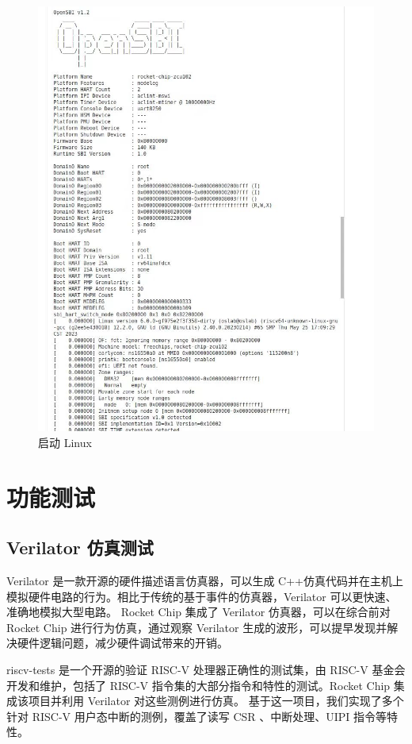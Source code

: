 \begin{figure}
    \centering
    \includegraphics[width=0.9\linewidth]{figures/boot-linux.jpg}
    \caption{启动 Linux}
    \label{fig:boot-linux}
\end{figure}

\section{功能测试}

\subsection{Verilator 仿真测试}
\label{sec:verilator}

Verilator \cite{verilator} 是一款开源的硬件描述语言仿真器，可以生成 C++仿真代码并在主机上模拟硬件电路的行为。相比于传统的基于事件的仿真器，Verilator 可以更快速、准确地模拟大型电路。
Rocket Chip 集成了 Verilator 仿真器，可以在综合前对 Rocket Chip 进行行为仿真，通过观察 Verilator 生成的波形，可以提早发现并解决硬件逻辑问题，减少硬件调试带来的开销。

riscv-tests \cite{riscvtests} 是一个开源的验证 RISC-V 处理器正确性的测试集，由 RISC-V 基金会开发和维护，包括了 RISC-V 指令集的大部分指令和特性的测试。Rocket Chip 集成该项目并利用 Verilator 对这些测例进行仿真。
基于这一项目，我们实现了多个针对 RISC-V 用户态中断的测例，覆盖了读写 CSR 、中断处理、UIPI 指令等特性。

